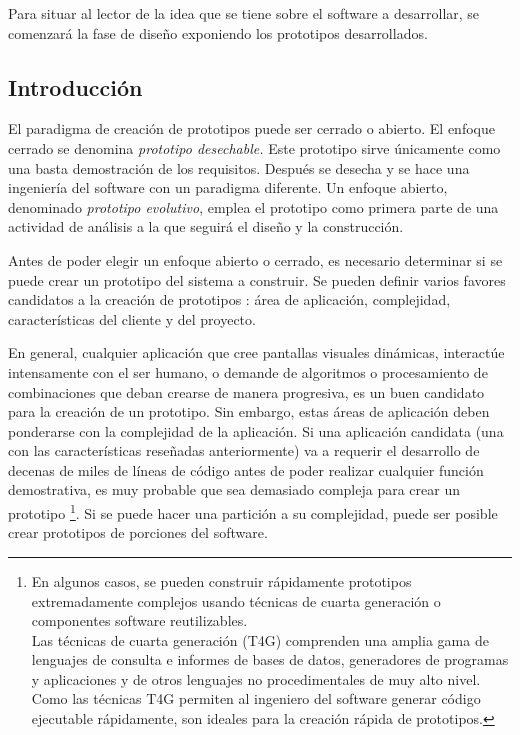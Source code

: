     Para situar al lector de la idea que se tiene sobre el software a desarrollar, se comenzará la fase de diseño exponiendo los prototipos desarrollados.
    
  	\subsection{Introducción} %
  		\label{sub:analisis_prototipo_introduccion}

  		El paradigma de creación de prototipos puede ser cerrado o abierto. El enfoque cerrado se denomina {\it prototipo desechable.} Este prototipo sirve únicamente como una basta demostración de los requisitos. Después se desecha y se hace una ingeniería del software con un paradigma diferente. Un enfoque abierto, denominado {\it prototipo evolutivo}, emplea el prototipo como primera parte de una actividad de análisis a la que seguirá el diseño y la construcción. 

  		Antes de poder elegir un enfoque abierto o cerrado, es necesario determinar si se puede crear un prototipo del sistema a construir. Se pueden definir varios favores candidatos a la creación de prototipos \cite{BOA84}: área de aplicación, complejidad, características del cliente y del proyecto.

  		En general, cualquier aplicación que cree pantallas visuales dinámicas, interactúe intensamente con el ser humano, o demande de algoritmos o procesamiento de combinaciones que deban crearse de manera progresiva, es un buen candidato para la creación de un prototipo. Sin embargo, estas áreas de aplicación deben ponderarse con la complejidad de la aplicación. Si una aplicación candidata (una con las características reseñadas anteriormente) va a requerir el desarrollo de decenas de miles de líneas de código antes de poder realizar cualquier función demostrativa, es muy probable que sea demasiado compleja para crear un prototipo \footnote{En algunos casos, se pueden construir rápidamente prototipos extremadamente complejos usando técnicas de cuarta generación o componentes software reutilizables. \\Las técnicas de cuarta generación (T4G) comprenden una amplia gama de lenguajes de consulta e informes de bases de datos, generadores de programas y aplicaciones y de otros lenguajes no procedimentales de muy alto nivel. Como las técnicas T4G permiten al ingeniero del software generar código ejecutable rápidamente, son ideales para la creación rápida de prototipos.}. Si se puede hacer una partición a su complejidad, puede ser posible crear prototipos de porciones del software.

